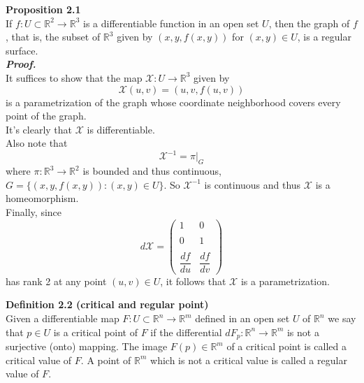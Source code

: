 \documentclass{article}
\begin{document}
\par
\textbf{Proposition 2.1}\\
If $f: U \subset \mathbb{R}^2 \to \mathbb{R}^3$ is a differentiable function in an open set $U$, then
the graph of $f$, that is, the subset of $\mathbb{R}^3$ given by $(x, y, f(x,y))$ for $(x,y) \in U$, is
a regular surface.\\
\textbf{\textit{Proof.}}\\
It suffices to show that the map $\mathcal{X}: U \to \mathbb{R}^3$ given by
$$
    \mathcal{X}(u,v) = (u,v,f(u,v))
$$
is a parametrization of the graph whose coordinate neighborhood covers every point
of the graph.\\
It's clearly that $\mathcal{X}$ is differentiable.\\
Also note that
$$
    \mathcal{X}^{-1} = \pi |_{G}
$$
where $\pi: \mathbb{R}^3 \to \mathbb{R}^2$ is bounded and thus continuous, $G=\{(x,y,f(x,y)): (x,y) \in U\}$. So $\mathcal{X}^{-1}$
is continuous and thus $\mathcal{X}$ is a homeomorphism.\\
Finally, since
$$
    d{\mathcal{X}} = 
    \left(\begin{array}{cc} 
        1 & 0 \\\\
        0 & 1 \\\\
        \dfrac{df}{du} & \dfrac{df}{dv}
    \end{array}\right)
$$
has rank 2 at any point $(u,v) \in U$, it follows that $\mathcal{X}$ is a parametrization.\quad \qedsymbol

\par
\textbf{Definition 2.2 (critical and regular point)}\\
Given a differentiable map $F: U \subset \mathbb{R}^n \to \mathbb{R}^m$ defined in an open set $U$ of $\mathbb{R}^n$ we
say that $p \in U$ is a critical point of $F$ if the differential $dF_p: \mathbb{R}^n \to \mathbb{R}^m$
is not a surjective (onto) mapping. The image $F(p) \in \mathbb{R}^m$ of a critical point is called a critical value of
$F$. A point of $\mathbb{R}^m$ which is not a critical value is called a regular value of $F$.
\end{document}
